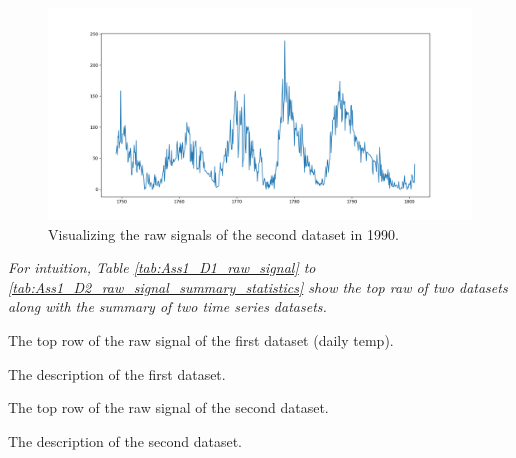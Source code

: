 \begin{figure}[H]
    \centering
    \begin{minipage}[b]{1\textwidth}
        \includegraphics[width=\textwidth]{figures/Ass1/Ass1_D2_raw_signal_1990.png}
    \end{minipage}
    \caption{Visualizing the raw signals of the second dataset in 1990.}
    \label{fig:Ass1_D2_raw_signal_1990}
\end{figure}

\textit{For intuition, Table \ref{tab:Ass1_D1_raw_signal} to  \ref{tab:Ass1_D2_raw_signal_summary_statistics} show the top raw of two datasets along with the summary of two time series datasets.}


\begin{table}[H]
 \centering
\caption{The top row of the raw signal of the first dataset (daily temp).
{\label{tab:Ass1_D1_raw_signal}}}

\end{table}

\begin{table}[H]
 \centering
\caption{The description of the first dataset.
{\label{tab:Ass1_D1_raw_signal_summary_statistics}}}

\end{table}

\begin{table}[H]
 \centering
\caption{The top row of the raw signal of the second dataset.
{\label{tab:Ass1_D2_raw_signal}}}

\end{table}

\begin{table}[H]
 \centering
\caption{The description of the second dataset.
{\label{tab:Ass1_D2_raw_signal_summary_statistics}}}

\end{table}






